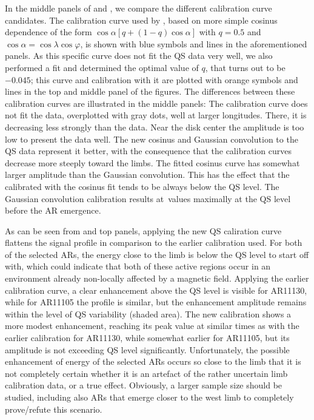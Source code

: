 \documentclass{aa}
\begin{document}
In the middle panels of  and , we compare the different calibration curve candidates.
The calibration curve used by 
\cite{SRB16},
based on more simple cosinus dependence of the form $\cos{\alpha} \left[q + \left(1-q \right) \cos{\alpha} \right]$ with $q=0.5$
and $\cos\alpha = \cos\lambda \cos\varphi$, is shown with blue symbols and lines in the aforementioned panels.
As this specific curve does not fit the QS data very well, we also performed a fit and determined the optimal value of $q$, that turns out to be $-0.045$; this curve and calibration with it are plotted with orange symbols and lines in the top and middle panel of the figures.
The differences between these calibration curves are illustrated in the middle panels: The \cite{SRB16} calibration
curve does not fit the data, overplotted with gray dots, well at larger longitudes. There, it 
is decreasing less strongly than the data. Near the disk center the amplitude is too low to present the data well.
The new cosinus and Gaussian convolution to the QS
data represent it better, with the consequence that the calibration curves decrease more steeply toward the limbs.
The fitted cosinus curve has somewhat larger amplitude than the Gaussian convolution. This has the effect that the \eft\,calibrated
with the cosinus fit tends to be always below the QS level. The Gaussian convolution calibration results at \eft\,values maximally at the QS level before the AR emergence.

As can be seen
from  and  top panels, 
applying the new QS caliration curve flattens the signal profile in comparison to the
earlier calibration used. For both of the selected ARs, the \fff energy close to the limb is below the QS level to start off with, which could indicate that both of these active regions occur in an environment 
already non-locally affected by a magnetic field. 
Applying the earlier calibration curve, a clear enhancement above the QS level is visible for AR11130, while for AR11105 the profile is similar, but the enhancement amplitude remains within the level of QS variability (shaded area). The new calibration shows a more modest enhancement, reaching its peak value at similar times as with the earlier calibration for AR11130, while somewhat earlier for AR11105, but its amplitude is not exceeding QS level significantly. Unfortunately, the possible enhancement of \fff energy of the selected ARs occurs so close to the limb that it is not completely certain whether it is an artefact of the rather uncertain limb calibration data, or a true effect. Obviously, a larger sample size should be studied, including also ARs that emerge closer to the west limb to completely prove/refute this scenario.  
\end{document}
